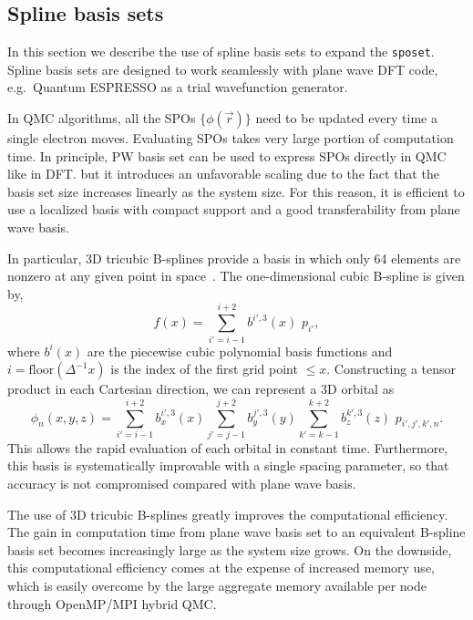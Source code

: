 \subsection{Spline basis sets}
\label{sec:spo_spline}
In this section we describe the use of spline basis sets to expand the \texttt{sposet}.
Spline basis sets are designed to work seamlessly with plane wave DFT code, e.g.\ Quantum ESPRESSO as a trial wavefunction generator.

In QMC algorithms, all the SPOs $\{\phi(\vec{r})\}$ need to be updated every time a single electron moves.
Evaluating SPOs takes very large portion of computation time.
In principle, PW basis set can be used to express SPOs directly in QMC like in DFT.
but it introduces an unfavorable scaling due to the fact 
that the basis set size increases linearly as the system size.
For this reason, it is efficient to use a localized basis with compact
support and a good transferability from plane wave basis. 

In particular, 3D tricubic B-splines provide a basis in which only
64 elements are nonzero at any given point in space~\cite{blips4QMC}.
The one-dimensional cubic B-spline is given by,
\begin{equation}
f(x) = \sum_{i'=i-1}^{i+2} b^{i'\!,3}(x)\,\,  p_{i'},
\label{eq:SplineFunc}
\end{equation}
where $b^{i}(x)$ are the piecewise cubic polynomial basis functions
and $i = \text{floor}(\Delta^{-1} x)$ is the index of
the first grid point $\le x$.  Constructing a tensor product in each Cartesian
direction, we can represent a 3D orbital as
\begin{equation}
  \phi_n(x,y,z) = 
  \!\!\!\!\sum_{i'=i-1}^{i+2} \!\! b_x^{i'\!,3}(x) 
  \!\!\!\!\sum_{j'=j-1}^{j+2} \!\! b_y^{j'\!,3}(y) 
  \!\!\!\!\sum_{k'=k-1}^{k+2} \!\! b_z^{k'\!,3}(z) \,\, p_{i', j', k',n}.
\label{eq:TricubicValue}
\end{equation}
This allows the rapid evaluation of each orbital in constant time.
Furthermore, this basis is systematically improvable with a single spacing
parameter, so that accuracy is not compromised compared with plane wave basis.

The use of 3D tricubic B-splines greatly improves the computational efficiency.
The gain in computation time from plane wave basis set to an equivalent B-spline basis set 
becomes increasingly large as the system size grows.
On the downside, this computational efficiency comes at
the expense of increased memory use, which is easily overcome by the large
aggregate memory available per node through OpenMP/MPI hybrid QMC.

